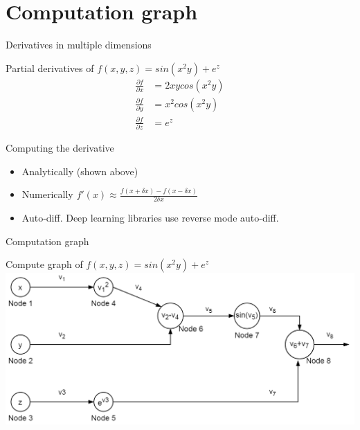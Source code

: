 \section{Computation graph}
\begin{frame}{Derivatives in multiple dimensions} 
	\begin{block}{ Partial derivatives of $f(x,y,z)= sin(x^2y)+e^z$}
		\begin{align}
			\frac{\partial f}{\partial x} &= 2xycos(x^2y) \\
			\frac{\partial f}{\partial y} &= x^2cos(x^2y) \\
			\frac{\partial f}{\partial z} &= e^z 
		\end{align}
	\end{block}
	Computing the derivative
		\begin{itemize}
			\item Analytically (shown above)
			\item Numerically $f'(x) \approx \frac{f(x+\delta x) - f(x-\delta x)}{2\delta x}$
			\item Auto-diff. Deep learning libraries use reverse mode auto-diff.
		\end{itemize}
\end{frame} 

\begin{frame}{Computation graph}
	\begin{block}{ Compute graph of $f(x,y,z)= sin(x^2y)+e^z$}
		\includegraphics[width=1.\textwidth, center]{figuras/backprop_eg1.png}
	\end{block}
\end{frame}

